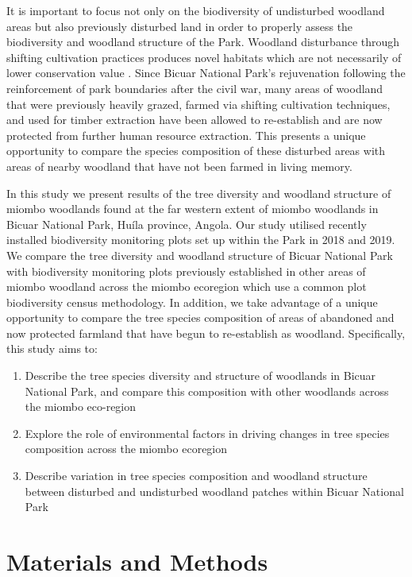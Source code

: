 \begin{refsection}
It is important to focus not only on the biodiversity of undisturbed woodland areas but also previously disturbed land in order to properly assess the biodiversity and woodland structure of the Park. Woodland disturbance through shifting cultivation practices produces novel habitats which are not necessarily of lower conservation value \citep{McNicol2015a, Goncalves2017}. Since Bicuar National Park's rejuvenation following the reinforcement of park boundaries after the civil war, many areas of woodland that were previously heavily grazed, farmed via shifting cultivation techniques, and used for timber extraction have been allowed to re-establish and are now protected from further human resource extraction. This presents a unique opportunity to compare the species composition of these disturbed areas with areas of nearby woodland that have not been farmed in living memory.

In this study we present results of the tree diversity and woodland structure of miombo woodlands found at the far western extent of miombo woodlands in Bicuar National Park, Hu\'{i}la province, Angola. Our study utilised recently installed biodiversity monitoring plots set up within the Park in 2018 and 2019. We compare the tree diversity and woodland structure of Bicuar National Park with biodiversity monitoring plots previously established in other areas of miombo woodland across the miombo ecoregion which use a common plot biodiversity census methodology. In addition, we take advantage of a unique opportunity to compare the tree species composition of areas of abandoned and now protected farmland that have begun to re-establish as woodland. Specifically, this study aims to:

\begin{enumerate}
\item{Describe the tree species diversity and structure of woodlands in Bicuar National Park, and compare this composition with other woodlands across the miombo eco-region}
\item{Explore the role of environmental factors in driving changes in tree species composition across the miombo ecoregion}
\item{Describe variation in tree species composition and woodland structure between disturbed and undisturbed woodland patches within Bicuar National Park}
\end{enumerate}

\section{Materials and Methods}
\label{bicuar:sec:methods}


\end{refsection}
